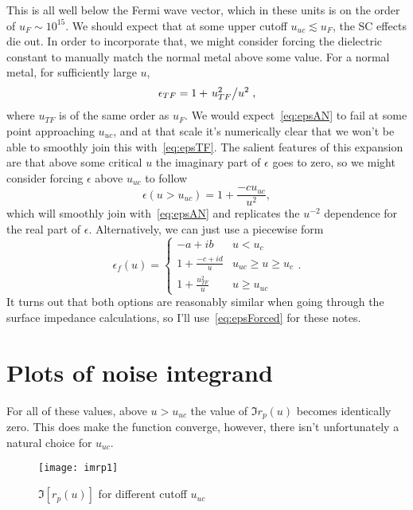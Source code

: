 \documentclass[11pt]{article}
\begin{document}
	This is all well below the Fermi wave vector, which in these units is on the order of $u_F \sim 10^{15}$.
	We should expect that at some upper cutoff $u_{uc} \lesssim u_F$, the SC effects die out.
	In order to incorporate that, we might consider forcing the dielectric constant to manually match the normal metal above some value.
	For a normal metal, for sufficiently large $u$,
	\begin{equation}
		\epsilon_{TF} = 1 + \flatfrac{u_{TF}^2}{u^2} \label{eq:epsTF},
	\end{equation}
	where $u_{TF}$ is of the same order as $u_F$.
	We would expect~\eqref{eq:epsAN} to fail at some point approaching $u_{uc}$, and at that scale it's numerically clear that we won't be able to smoothly join this with~\eqref{eq:epsTF}.
	The salient features of this expansion are that above some critical $u$ the imaginary part of $\epsilon$ goes to zero, so we might consider forcing $\epsilon$ above $u_{uc}$ to follow
	\begin{equation}
		\epsilon(u > u_{uc}) = 1 + \frac{-c u_{uc}}{u^2}, \label{eq:epsSmoothJoin}
	\end{equation}
	which will smoothly join with~\eqref{eq:epsAN} and replicates the $u^{-2}$ dependence for the real part of $\epsilon$.
	Alternatively, we can just use a piecewise form
	\begin{equation}
		\epsilon_f(u) =
		\begin{cases}
			-a + i b & u < u_c \\
			1 + \frac{-c + i d}{u} &  u_{uc} \geq u \geq u_c \\
			1 + \frac{u_{TF}^2}{u} &  u \geq u_{uc}
		\end{cases}. \label{eq:epsForced}
	\end{equation}
	It turns out that both options are reasonably similar when going through the surface impedance calculations, so I'll use~\eqref{eq:epsForced} for these notes.

	\section{Plots of noise integrand} \label{sec:plotsdiscussion}

	For all of these values, above $u > u_{uc}$ the value of $\Im r_p(u)$ becomes identically zero.
	This does make the function converge, however, there isn't unfortunately a natural choice for $u_{uc}$.
	\begin{figure}[htp]
		\centering
		\texttt{[image: imrp1]}
		\caption{$\Im[r_p(u)]$ for different cutoff $u_{uc}$} \label{fig:imrpVsCutoff}
	\end{figure}
\end{document}
